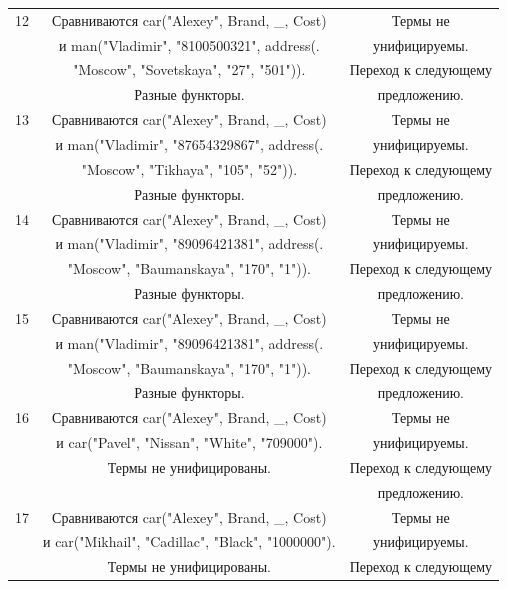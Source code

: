 \documentclass[12pt]{report}
\begin{document}
\newpage

\begin{table}[H]
	\begin{center}
		\begin{tabular}{|c c c |} 
			\hline
			12 & Сравниваются car("Alexey"{}, Brand, \_, Cost) & Термы не \\
			& и man("Vladimir"{}, "8100500321"{}, address(. & унифицируемы. \\
			& "Moscow"{}, "Sovetskaya"{}, "27"{}, "501"{})).  & Переход к следующему \\
			& Разные функторы. & предложению. \\
			\hline
			13 & Сравниваются car("Alexey"{}, Brand, \_, Cost) & Термы не \\
			& и man("Vladimir"{}, "87654329867"{}, address(. & унифицируемы. \\
			& "Moscow"{}, "Tikhaya"{}, "105"{}, "52"{})).  & Переход к следующему \\
			& Разные функторы. & предложению. \\
			\hline
			14 & Сравниваются car("Alexey"{}, Brand, \_, Cost) & Термы не \\
			& и man("Vladimir"{}, "89096421381"{}, address(. & унифицируемы. \\
			& "Moscow"{}, "Baumanskaya"{}, "170"{}, "1"{})).  & Переход к следующему \\
			& Разные функторы. & предложению. \\
			\hline
			15 & Сравниваются car("Alexey"{}, Brand, \_, Cost) & Термы не \\
			& и man("Vladimir"{}, "89096421381"{}, address(. & унифицируемы. \\
			& "Moscow"{}, "Baumanskaya"{}, "170"{}, "1"{})).  & Переход к следующему \\
			& Разные функторы. & предложению. \\
			\hline
			16 & Сравниваются car("Alexey"{}, Brand, \_, Cost) & Термы не \\
			& и car("Pavel"{}, "Nissan"{}, "White"{}, "709000"{}). & унифицируемы. \\
			& Термы не унифицированы.  & Переход к следующему \\
			&  & предложению. \\
			\hline
			17 & Сравниваются car("Alexey"{}, Brand, \_, Cost) & Термы не \\
			& и car("Mikhail"{}, "Cadillac"{}, "Black"{}, "1000000"{}). & унифицируемы. \\
			& Термы не унифицированы.  & Переход к следующему \\

\end{tabular}
\end{center}
\end{table}
\end{document}
